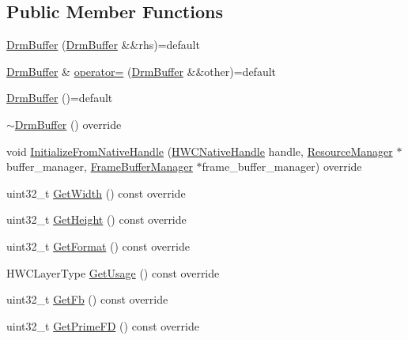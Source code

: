 \subsection*{Public Member Functions}
\begin{DoxyCompactItemize}
\item 
\mbox{\hyperlink{classhwcomposer_1_1DrmBuffer_a9e23026b53d528ccd9f1a71fbc153ef1}{Drm\+Buffer}} (\mbox{\hyperlink{classhwcomposer_1_1DrmBuffer}{Drm\+Buffer}} \&\&rhs)=default
\item 
\mbox{\hyperlink{classhwcomposer_1_1DrmBuffer}{Drm\+Buffer}} \& \mbox{\hyperlink{classhwcomposer_1_1DrmBuffer_a6d58dec7ca17507de42f722d1af88baa}{operator=}} (\mbox{\hyperlink{classhwcomposer_1_1DrmBuffer}{Drm\+Buffer}} \&\&other)=default
\item 
\mbox{\hyperlink{classhwcomposer_1_1DrmBuffer_a74144267227d5213648330cd9d9a6bfe}{Drm\+Buffer}} ()=default
\item 
\mbox{\hyperlink{classhwcomposer_1_1DrmBuffer_adc5f481329b7469ae558a3b12474f390}{$\sim$\+Drm\+Buffer}} () override
\item 
void \mbox{\hyperlink{classhwcomposer_1_1DrmBuffer_afced6df8661c057ca6b7195d16c49a80}{Initialize\+From\+Native\+Handle}} (\mbox{\hyperlink{alios_2platformdefines_8h_ac0a2eaf260f556d17fe489911f017bdf}{H\+W\+C\+Native\+Handle}} handle, \mbox{\hyperlink{classhwcomposer_1_1ResourceManager}{Resource\+Manager}} $\ast$buffer\+\_\+manager, \mbox{\hyperlink{classhwcomposer_1_1FrameBufferManager}{Frame\+Buffer\+Manager}} $\ast$frame\+\_\+buffer\+\_\+manager) override
\item 
uint32\+\_\+t \mbox{\hyperlink{classhwcomposer_1_1DrmBuffer_ac4af6516c644cfb6bbf34083bbdc94ae}{Get\+Width}} () const override
\item 
uint32\+\_\+t \mbox{\hyperlink{classhwcomposer_1_1DrmBuffer_a42a02adf7559b89d4f9f958242880b61}{Get\+Height}} () const override
\item 
uint32\+\_\+t \mbox{\hyperlink{classhwcomposer_1_1DrmBuffer_a35eecd412bab8ea5822ec7a81c2fc34a}{Get\+Format}} () const override
\item 
H\+W\+C\+Layer\+Type \mbox{\hyperlink{classhwcomposer_1_1DrmBuffer_a41cb25d650c188e8be9ffa972776680b}{Get\+Usage}} () const override
\item 
uint32\+\_\+t \mbox{\hyperlink{classhwcomposer_1_1DrmBuffer_accd7dc14e04bd76beca146fc3d265f81}{Get\+Fb}} () const override
\item 
uint32\+\_\+t \mbox{\hyperlink{classhwcomposer_1_1DrmBuffer_a5844745322eb108eddb1e41eb1cf4f40}{Get\+Prime\+FD}} () const override

\end{DoxyCompactItemize}
